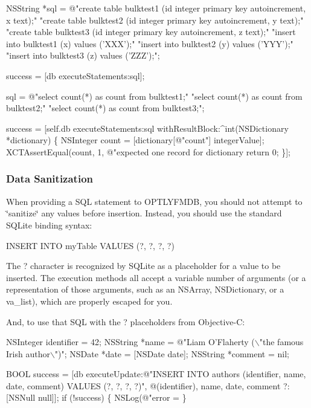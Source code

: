 \begin{DoxyCode}
NSString *sql = @"create table bulktest1 (id integer primary key autoincrement, x text);"
                 "create table bulktest2 (id integer primary key autoincrement, y text);"
                 "create table bulktest3 (id integer primary key autoincrement, z text);"
                 "insert into bulktest1 (x) values ('XXX');"
                 "insert into bulktest2 (y) values ('YYY');"
                 "insert into bulktest3 (z) values ('ZZZ');";

success = [db executeStatements:sql];

sql = @"select count(*) as count from bulktest1;"
       "select count(*) as count from bulktest2;"
       "select count(*) as count from bulktest3;";

success = [self.db executeStatements:sql withResultBlock:^int(NSDictionary *dictionary) \{
    NSInteger count = [dictionary[@"count"] integerValue];
    XCTAssertEqual(count, 1, @"expected one record for dictionary %
    return 0;
\}];
\end{DoxyCode}


\subsubsection*{Data Sanitization}

When providing a S\+QL statement to O\+P\+T\+L\+Y\+F\+M\+DB, you should not attempt to \char`\"{}sanitize\char`\"{} any values before insertion. Instead, you should use the standard S\+Q\+Lite binding syntax\+:


\begin{DoxyCode}
\textcolor{keyword}{INSERT} \textcolor{keyword}{INTO} myTable \textcolor{keyword}{VALUES} (?, ?, ?, ?)
\end{DoxyCode}


The {\ttfamily ?} character is recognized by S\+Q\+Lite as a placeholder for a value to be inserted. The execution methods all accept a variable number of arguments (or a representation of those arguments, such as an {\ttfamily N\+S\+Array}, {\ttfamily N\+S\+Dictionary}, or a {\ttfamily va\+\_\+list}), which are properly escaped for you.

And, to use that S\+QL with the {\ttfamily ?} placeholders from Objective-\/C\+:


\begin{DoxyCode}
NSInteger identifier = 42;
NSString *name = @"Liam O'Flaherty (\(\backslash\)"the famous Irish author\(\backslash\)")";
NSDate *date = [NSDate date];
NSString *comment = nil;

BOOL success = [db executeUpdate:@"INSERT INTO authors (identifier, name, date, comment) VALUES (?, ?, ?,
       ?)", @(identifier), name, date, comment ?: [NSNull null]];
if (!success) \{
    NSLog(@"error = %
\}
\end{DoxyCode}


